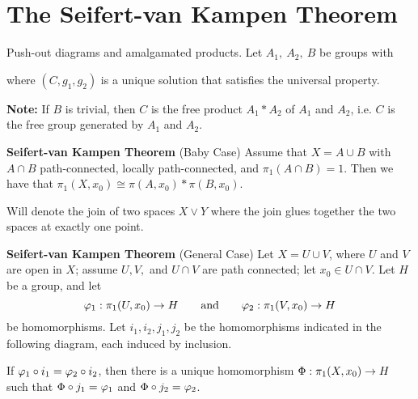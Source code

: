 \newpage
\setcounter{section}{11}
\section{The Seifert-van Kampen Theorem}
\vs


\dfn Push-out diagrams and amalgamated products. Let $A_1,\ A_2,\ B$ be groups with
\begin{center}
\end{center}
where $(C, g_1, g_2)$ is a unique solution that satisfies the universal property.

\textbf{Note:} If $B$ is trivial, then $C$ is the free product $A_1*A_2$ of $A_1$ and $A_2$, i.e. $C$ is the free group generated by $A_1$ and $A_2$.

\textbf{Seifert-van Kampen Theorem} (Baby Case) Assume that $X = A\cup B$ with $A\cap B$ path-connected, locally path-connected, and $\pi_1(A\cap B) = 1$. Then we have that $\pi_1(X, x_0) \cong \pi(A, x_0) * \pi(B, x_0)$.

\dfn Will denote the join of two spaces $X\vee Y$ where the join glues together the two spaces at exactly one point.

\textbf{Seifert-van Kampen Theorem} (General Case) Let $X = U\cup V$, where $U$ and $V$ are open in $X$; assume $U, V,$ and $U\cap V$ are path connected; let $x_0\in U\cap V$. Let $H$ be a group, and let
\[\varphi_1:\pi_1(U, x_0)\rightarrow H\qquad\text{and}\qquad\varphi_2:\pi_1(V,x_0)\rightarrow H\]
be homomorphisms. Let $i_1,i_2,j_1,j_2$ be the homomorphisms indicated in the following diagram, each induced by inclusion.
\begin{center}
\end{center}
If $\varphi_1\circ i_1 = \varphi_2\circ i_2$, then there is a unique homomorphism $\Phi:\pi_1(X, x_0)\rightarrow H$ such that $\Phi\circ j_1 = \varphi_1$ and $\Phi\circ j_2 = \varphi_2$.





